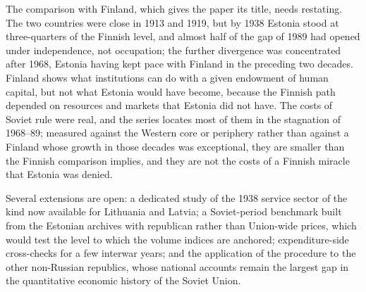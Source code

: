 The comparison with Finland, which gives the paper its title, needs restating. The two countries were close in 1913 and 1919, but by 1938 Estonia stood at three-quarters of the Finnish level, and almost half of the gap of 1989 had opened under independence, not occupation; the further divergence was concentrated after 1968, Estonia having kept pace with Finland in the preceding two decades. Finland shows what institutions can do with a given endowment of human capital, but not what Estonia would have become, because the Finnish path depended on resources and markets that Estonia did not have. The costs of Soviet rule were real, and the series locates most of them in the stagnation of 1968--89; measured against the Western core or periphery rather than against a Finland whose growth in those decades was exceptional, they are smaller than the Finnish comparison implies, and they are not the costs of a Finnish miracle that Estonia was denied.

Several extensions are open: a dedicated study of the 1938 service sector of the kind now available for Lithuania and Latvia; a Soviet-period benchmark built from the Estonian archives with republican rather than Union-wide prices, which would test the level to which the volume indices are anchored; expenditure-side cross-checks for a few interwar years; and the application of the procedure to the other non-Russian republics, whose national accounts remain the largest gap in the quantitative economic history of the Soviet Union.

